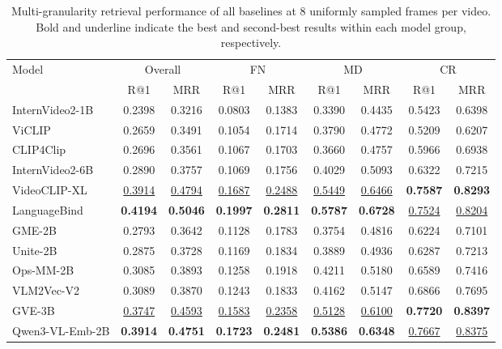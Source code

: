 \begin{table}[t]
    \centering
    \caption{Multi-granularity retrieval performance of all baselines at 8 uniformly sampled frames per video. Bold and underline indicate the best and second-best results within each model group, respectively.}
    \label{mglvr:tab:main_results_8f}
    \setlength{\tabcolsep}{2pt}
    \begin{tabular}{@{}l*{8}{c}@{}}
\toprule
Model & \multicolumn{2}{c|}{Overall} & \multicolumn{2}{c|}{FN} & \multicolumn{2}{c|}{MD} & \multicolumn{2}{c}{CR} \\
      & R@1   & MRR   & R@1   & MRR   & R@1   & MRR   & R@1   & MRR \\
\midrule
InternVideo2-1B         & 0.2398 & 0.3216 & 0.0803 & 0.1383 & 0.3390 & 0.4435 & 0.5423 & 0.6398 \\
ViCLIP                  & 0.2659 & 0.3491 & 0.1054 & 0.1714 & 0.3790 & 0.4772 & 0.5209 & 0.6207 \\
CLIP4Clip               & 0.2696 & 0.3561 & 0.1067 & 0.1703 & 0.3660 & 0.4757 & 0.5966 & 0.6938 \\
InternVideo2-6B         & 0.2890 & 0.3757 & 0.1069 & 0.1756 & 0.4029 & 0.5093 & 0.6322 & 0.7215 \\
VideoCLIP-XL            & \underline{0.3914} & \underline{0.4794} & \underline{0.1687} & \underline{0.2488} & \underline{0.5449} & \underline{0.6466} & \textbf{0.7587} & \textbf{0.8293} \\
LanguageBind            & \textbf{0.4194} & \textbf{0.5046} & \textbf{0.1997} & \textbf{0.2811} & \textbf{0.5787} & \textbf{0.6728} & \underline{0.7524} & \underline{0.8204} \\
\midrule
GME-2B                  & 0.2793 & 0.3642 & 0.1128 & 0.1783 & 0.3754 & 0.4816 & 0.6224 & 0.7101 \\
Unite-2B                & 0.2875 & 0.3728 & 0.1169 & 0.1834 & 0.3889 & 0.4936 & 0.6287 & 0.7213 \\
Ops-MM-2B               & 0.3085 & 0.3893 & 0.1258 & 0.1918 & 0.4211 & 0.5180 & 0.6589 & 0.7416 \\
VLM2Vec-V2              & 0.3089 & 0.3870 & 0.1243 & 0.1833 & 0.4162 & 0.5147 & 0.6866 & 0.7695 \\
GVE-3B                  & \underline{0.3747} & \underline{0.4593} & \underline{0.1583} & \underline{0.2358} & \underline{0.5128} & \underline{0.6100} & \textbf{0.7720} & \textbf{0.8397} \\
Qwen3-VL-Emb-2B         & \textbf{0.3914} & \textbf{0.4751} & \textbf{0.1723} & \textbf{0.2481} & \textbf{0.5386} & \textbf{0.6348} & \underline{0.7667} & \underline{0.8375} \\

\end{tabular}
\end{table}
